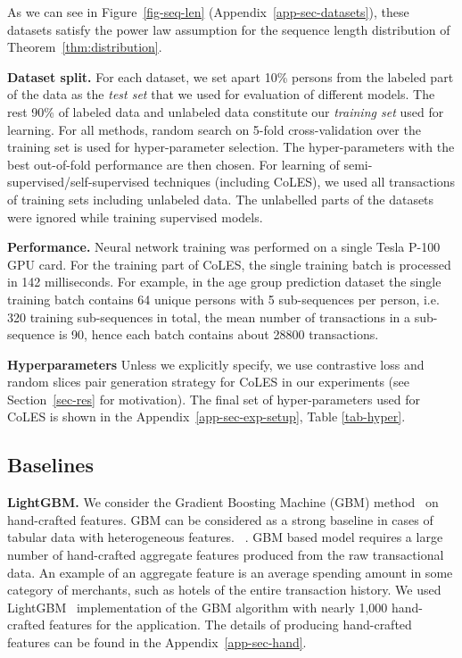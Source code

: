 \documentclass{article}
\begin{document}
As we can see in Figure~\ref{fig-seq-len} (Appendix~\ref{app-sec-datasets}), these datasets satisfy the power law assumption for the sequence length distribution of Theorem~\ref{thm:distribution}.


\textbf{Dataset split.} For each dataset, we set apart 10\% persons from the labeled part of the data as the \textit{test set} that we used for evaluation of different models. The rest 90\% of labeled data and unlabeled data constitute our \textit{training set} used for learning. For all methods, random search on 5-fold cross-validation over the training set is used for hyper-parameter selection. The hyper-parameters with the best out-of-fold performance are then chosen.
For learning of semi-supervised/self-supervised techniques (including CoLES), we used all transactions of training sets including unlabeled data. The unlabelled parts of the datasets were ignored while training supervised models.

\textbf{Performance.} Neural network training was performed on a single Tesla P-100 GPU card. For the training part of CoLES, the single training batch is processed in 142 milliseconds. For example, in the age group prediction dataset the single training batch contains 64 unique persons with 5 sub-sequences per person, i.e. 320 training sub-sequences in total, the mean number of transactions in a sub-sequence is 90, hence each batch contains about 28800 transactions.

\textbf{Hyperparameters} Unless we explicitly specify, we use contrastive loss and random slices pair generation strategy for CoLES in our experiments (see Section~\ref{sec-res} for motivation). The final set of hyper-parameters used for CoLES is shown in the Appendix~\ref{app-sec-exp-setup}, Table \ref{tab-hyper}.

\subsection{Baselines} \label{sec-baselines}


\textbf{LightGBM.} We consider the Gradient Boosting Machine (GBM) method~\citep{Friedman2001GreedyFA} on hand-crafted features. GBM can be considered as a strong baseline in cases of tabular data with heterogeneous features.
~\citep{Wu2009AdaptingBF, Vorobev2019LearningTS, Zhang2015AGB, Niu2019ACS}.
GBM based model requires a large number of hand-crafted aggregate features produced from the raw transactional data. An example of an aggregate feature is an average spending amount in some category of merchants, such as hotels of the entire transaction history.
We used LightGBM~\citep{Ke2017LightGBMAH} implementation of the GBM algorithm with nearly 1,000 hand-crafted features for the application. The details of producing hand-crafted features can be found in the Appendix~\ref{app-sec-hand}.
\end{document}

